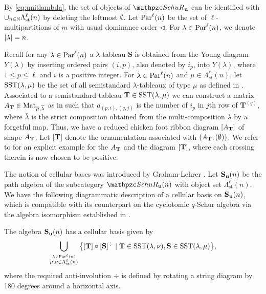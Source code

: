 By \eqref{eq:unitlambda}, the set of objects of $\qSchu$ can be identified with $\cup_{n\in \mathbb{N}}\Lambda_{\text{st}}^{\ell}(n)$ by deleting the leftmost $\emptyset$.
Let $\text{Par}^\ell(n)$  be the set of $\ell$-multipartitions  of $m$ with usual dominance order $\lhd$. For $\lambda\in \text{Par}^\ell(n)$, we denote $|\lambda|=n$. 

Recall for any $\lambda\in\text{Par}^\ell(n)$ a $\lambda$-tableau $\mathbf S$ is obtained from the Young diagram $Y(\lambda)$ by inserting ordered pairs $(i,p)$, also denoted by $i_p$, into $Y(\lambda)$, where $1\le p\le \ell$ and $i$ is a positive integer.
For $\lambda\in\text{Par}^\ell(n)$ and $\mu\in \Lambda_{st}^\ell(n)$, let $\text{SST}(\lambda,\mu)$ be the set of all semistandard $\lambda$-tableaux of type $\mu$ as defined in \cite{DJM98}. Associated to a semistandard tableau $\mathbf{T}\in \text{SST}(\lambda,\mu)$  we can construct a matrix $A_{\mathbf{T}}\in \text{Mat}_{\overline{\mu},\overline{\lambda}}$ as in \cite[\S 4.5]{SW24Schur} such that $a_{(p,i),(q,j)}$ is the number of $i_p$ in $j$th row of $\mathbf T^{(q)}$, where $\bar \lambda $ is the strict composition obtained from the multi-composition  $\lambda$ by a forgetful map. Thus, we have a reduced chicken foot ribbon diagram $[A_{\mathbf{T}}]$  of shape $A_{\mathbf{T}}$. Let $[\mathbf{T}]$ denote the ornamentation associated with $(A_{\mathbf{T}},(\emptyset))$. We refer to \cite[Example 4.8]{SW24Schur} for an explicit example for the $A_{\mathbf{T}}$ and the diagram $[\mathbf{T}]$, where each crossing therein is now chosen to be positive.


The notion of cellular bases was introduced by Graham-Lehrer \cite{GL96}. Let $\mathbf{S}_{\mathbf{u}}(n)$ be the path algebra of the subcategory  $\qSchu(n)$ with object set $\Lambda_{\text{st}}^{\ell}(n)$. 
We have the following diagrammatic description of a cellular basis on $\mathbf{S}_{\mathbf{u}}(n)$, which is compatible with its counterpart on the cyclotomic $q$-Schur algebra \cite{DJM98} via the algebra isomorphism established in \cite{SSW25}. 

\begin{proposition}  \cite[Theorems 5.12, 5.13]{SSW25}
    The algebra $\mathbf{S}_{\mathbf{u}}(n)$ has a cellular  basis given by 
\begin{align}  \label{doubleSST}
\bigcup_{\overset{\lambda\in \text{Par}^\ell(n)}{\mu,\nu\in \Lambda_{\text{st}}^\ell(n)} }
\big\{ [\mathbf{T}]\circ [\mathbf{S}]^\div \mid \mathbf{T}\in \text{SST}(\lambda,\nu), \mathbf{S}\in \text{SST}(\lambda,\mu) \big\}, 
\end{align}
where the required anti-involution $\div$ is defined by rotating a string diagram by 180 degrees around a horizontal axis.
\end{proposition}

